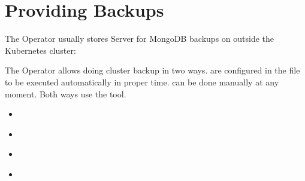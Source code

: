 \documentclass[letterpaper,10pt,english]{sphinxmanual}
\begin{document}
\chapter{Providing Backups}
\label{\detokenize{backups:providing-backups}}\label{\detokenize{backups::doc}}
The Operator usually stores Server for MongoDB backups on  outside the Kubernetes cluster:

\begin{figure}[htbp]
\centering

\noindent{}
\end{figure}

The Operator allows doing cluster backup in two
ways.  are configured in the
file to be executed automatically in proper time. 
can be done manually at any moment. Both ways use the  tool.

\begin{sphinxShadowBox}
\begin{itemize}
\item {} 
\label{\detokenize{backups:id3}}{\hyperref[\detokenize{backups:making-scheduled-backups}]{}}

\item {} 
\label{\detokenize{backups:id4}}{\hyperref[\detokenize{backups:making-on-demand-backup}]{}}

\item {} 
\label{\detokenize{backups:id5}}{\hyperref[\detokenize{backups:restore-the-cluster-from-a-previously-saved-backup}]{}}

\item {} 
\label{\detokenize{backups:id6}}{\hyperref[\detokenize{backups:delete-the-unneeded-backup}]{}}

\end{itemize}
\end{sphinxShadowBox}
\end{document}
